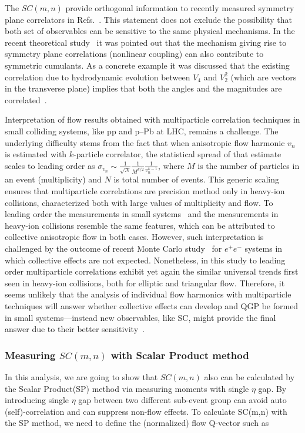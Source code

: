 The $SC(m,n)$ provide orthogonal information to recently measured symmetry plane correlators in Refs.~\cite{ALICE:2011ab,Adare:2011tg,Aad:2014fla}. This statement does not exclude the possibility that both set of observables can be sensitive to the same physical mechanisms. In the recent theoretical study~\cite{Giacalone:2016afq} it was pointed out that the mechanism giving rise to symmetry plane correlations (nonlinear coupling) can also contribute to symmetric cumulants. As a concrete example it was discussed that the existing correlation due to hydrodynamic evolution between $V_4$ and $V_2^2$ (which are vectors in the transverse plane) implies that both the angles and the magnitudes are correlated~\cite{Giacalone:2016afq}. 

Interpretation of flow results obtained with multiparticle correlation techniques in small colliding systems, like pp and p--Pb at LHC, remains a challenge. The underlying difficulty stems from the fact that when anisotropic flow harmonic $v_n$ is estimated with $k$-particle correlator, the statistical spread of that estimate scales to leading order as $\sigma_{v_{n}}\sim\frac{1}{\sqrt{N}}\frac{1}{M^{k/2}}\frac{1}{v_{n}^{k-1}}$, where $M$ is the number of particles in an event (multiplicity) and $N$ is total number of events. This generic scaling ensures that multiparticle correlations are precision method only in heavy-ion collisions, characterized both with large values of multiplicity and flow. To leading order the measurements in small systems~\cite{Aad:2013fja,Abelev:2014mda,Khachatryan:2015waa,Adamczyk:2015xjc,Adare:2015ctn} and the measurements in heavy-ion collisions resemble the same features, which can be attributed to collective anisotropic flow in both cases. However, such interpretation is challenged by the outcome of recent Monte Carlo study~\cite{Loizides:2016tew} for $e^+e^-$ systems in which collective effects are not expected. Nonetheless, in this study to leading order multiparticle correlations exhibit yet again the similar universal trends first seen in heavy-ion collisions, both for elliptic and triangular flow. Therefore, it seems unlikely that the analysis of individual flow harmonics with multiparticle techniques will answer whether collective effects can develop and QGP be formed in small systems---instead new observables, like SC, might provide the final answer due to their better sensitivity~\cite{Niemi:2012aj,ALICE:2016kpq}.



\subsubsection{Measuring $SC(m,n)$ with Scalar Product method}
In this analysis, we are going to show that $SC(m,n)$ also can be calculated  by the Scalar Product(SP) method via measuring moments \cite{Bhalerao:2015jg} with single $\eta$ gap. By introducing single $\eta$ gap between two different sub-event group can avoid auto (self)-correlation and can suppress non-flow effects. To calculate SC(m,n) with the SP method, we need to define the (normalized) flow Q-vector such as

